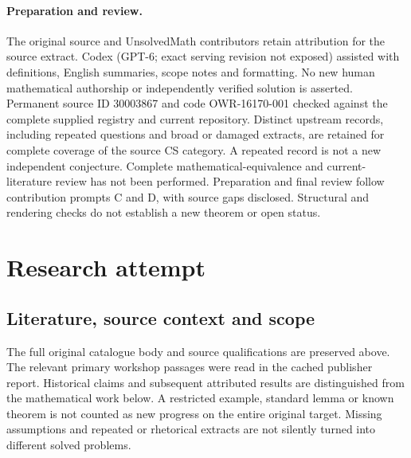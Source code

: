 \documentclass[11pt]{article}
\begin{document}
\paragraph{Preparation and review.}
The original source and UnsolvedMath contributors retain attribution for the source extract. Codex (GPT-6; exact serving revision not exposed) assisted with definitions, English summaries, scope notes and formatting. No new human mathematical authorship or independently verified solution is asserted. Permanent source ID 30003867 and code OWR-16170-001 checked against the complete supplied registry and current repository. Distinct upstream records, including repeated questions and broad or damaged extracts, are retained for complete coverage of the source CS category. A repeated record is not a new independent conjecture. Complete mathematical-equivalence and current-literature review has not been performed. Preparation and final review follow contribution prompts C and D, with source gaps disclosed. Structural and rendering checks do not establish a new theorem or open status.
\label{end:30003867}

\section{Research attempt}
\subsection{Literature, source context and scope}
The full original catalogue body and source qualifications are preserved above. The relevant primary workshop passages were read in the cached publisher report. Historical claims and subsequent attributed results are distinguished from the mathematical work below. A restricted example, standard lemma or known theorem is not counted as new progress on the entire original target. Missing assumptions and repeated or rhetorical extracts are not silently turned into different solved problems.
\end{document}

